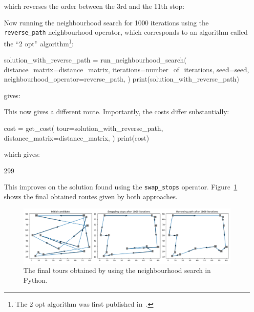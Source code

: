 which reverses the order between the 3rd and the 11th stop:

\begin{pyout}
[0, 7, 4, 10, 8, 2, 9, 3, 11, 5, 12, 1, 6, 0]
\end{pyout}

Now running the neighbourhood search for 1000 iterations using the
\texttt{reverse_path} neighbourhood operator, which corresponds to
an algorithm called the ``2 opt'' algorithm\footnote{The 2 opt algorithm was
first published in~\autocite{croes1958method}.
}:

\begin{pyin}
solution_with_reverse_path = run_neighbourhood_search(
    distance_matrix=distance_matrix,
    iterations=number_of_iterations,
    seed=seed,
    neighbourhood_operator=reverse_path,
)
print(solution_with_reverse_path)
\end{pyin}

gives:

\begin{pyout}
[0, 8, 5, 3, 1, 9, 12, 11, 4, 10, 6, 2, 7, 0]
\end{pyout}

This now gives a different route.
Importantly, the costs differ substantially:

\begin{pyin}
cost = get_cost(
    tour=solution_with_reverse_path,
    distance_matrix=distance_matrix,
)
print(cost)
\end{pyin}

which gives:

\begin{pyout}
299
\end{pyout}

This improves on the solution found using the \texttt{swap_stops}
operator. Figure~\ref{fig:final-tsp-tours-python} shows the final obtained
routes given by both approaches.

\begin{figure}
    \begin{center}
        \includegraphics[width=\textwidth]{./assets/final-tsp-tours-with-python/main.pdf}
    \end{center}
    \caption{The final tours obtained by using the neighbourhood search in
    Python.}
    \label{fig:final-tsp-tours-python}
\end{figure}



